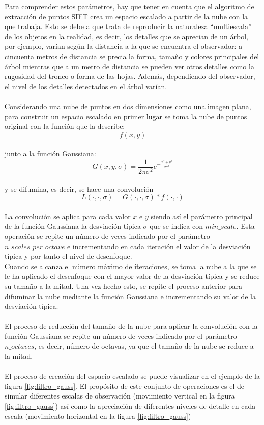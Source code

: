 Para comprender estos parámetros, hay que tener en cuenta que el algoritmo de extracción de puntos SIFT crea un espacio escalado a partir de la nube con la que trabaja. Esto se debe a que trata de reproducir la naturaleza ``multiescala''\cite{sift_escala} de los objetos en la realidad, es decir, los detalles que se aprecian de un árbol, por ejemplo, varían según la distancia a la que se encuentra el observador: a cincuenta metros de distancia se precia la forma, tamaño y colores principales del árbol mientras que a un metro de distancia se pueden ver otros detalles como la rugosidad del tronco o forma de las hojas. Además, dependiendo del observador, el nivel de los detalles detectados en el árbol varían.
\\
\\
Considerando una nube de puntos en dos dimensiones como una imagen plana, para construir un espacio escalado en primer lugar se toma la nube de puntos original con la función que la describe: 
$$f(x,y)$$ 
\\
junto a la función Gaussiana:
$$G(x,y,\sigma)=\frac{1}{2\pi\sigma^2}e^{-\frac{x^2+y^2}{2\sigma^2}}$$
\\
y se difumina, es decir, se hace una convolución\cite{gaussiana} 
$$L(\cdot,\cdot,\sigma)=G(\cdot,\cdot,\sigma)*f(\cdot,\cdot)$$
\\
La convolución se aplica para cada valor $x$ e $y$ siendo así el parámetro principal de la función Gaussiana la desviación típica $\sigma$ que se indica con $min\_scale$. Esta operación se repite un número de veces indicado por el parámetro $n\_scales\_per\_octave$ e incrementando en cada iteración el valor de la desviación típica y por tanto el nivel de desenfoque.
\\
Cuando se alcanza el número máximo de iteraciones, se toma la nube a la que se le ha aplicado el desenfoque con el mayor valor de la desviación típica y se reduce su tamaño a la mitad. Una vez hecho esto, se repite el proceso anterior para difuminar la nube mediante la función Gaussiana e incrementando su valor de la desviación típica. 
\\
\\
El proceso de reducción del tamaño de la nube para aplicar la convolución con la función Gaussiana se repite un número de veces indicado por el parámetro $n\_octaves$, es decir, número de octavas, ya que el tamaño de la nube se reduce a la mitad.
\\
\\
El proceso de creación del espacio escalado se puede visualizar en el ejemplo de la figura \ref{fig:filtro_gauss}. El propósito de este conjunto de operaciones es el de simular diferentes escalas de observación (movimiento vertical en la figura \ref{fig:filtro_gauss}) así como la apreciación de diferentes niveles de detalle en cada escala (movimiento horizontal en la figura \ref{fig:filtro_gauss})  
